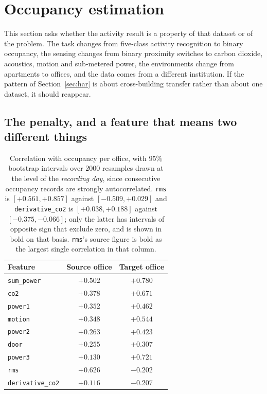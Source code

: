 \documentclass[a4paper,fleqn]{cas-dc}
\begin{document}
\section{Occupancy estimation}
\label{sec:occ}

This section asks whether the activity result is a property of that dataset or of the
problem. The task changes from five-class activity recognition to binary occupancy, the
sensing changes from binary proximity switches to carbon dioxide, acoustics, motion and
sub-metered power, the environments change from apartments to offices, and the data comes
from a different institution. If the pattern of Section~\ref{sec:har} is about
cross-building transfer rather than about one dataset, it should reappear.

\subsection{The penalty, and a feature that means two different things}
\label{sec:occ-feat}

\begin{table}[t]
\centering
\caption{Correlation with occupancy per office, with $95\%$ bootstrap intervals over
$2000$ resamples drawn at the level of the \emph{recording day}, since consecutive
occupancy records are strongly autocorrelated. \texttt{rms} is $[+0.561,+0.857]$ against
$[-0.509,+0.029]$ and \texttt{derivative\_co2} is $[+0.038,+0.188]$ against
$[-0.375,-0.066]$; only the latter has intervals of opposite sign that exclude zero, and
is shown in bold on that basis. \texttt{rms}'s source figure is bold as the largest single
correlation in that column.}
\label{tab:occfeat}
\footnotesize
\setlength{\tabcolsep}{3pt}
\begin{tabular}{@{}lcc@{}}
\toprule
Feature & Source office & Target office \\
\midrule
\texttt{sum\_power} & $+0.502$ & $+0.780$ \\
\texttt{co2}        & $+0.378$ & $+0.671$ \\
\texttt{power1}     & $+0.352$ & $+0.462$ \\
\texttt{motion}     & $+0.348$ & $+0.544$ \\
\texttt{power2}     & $+0.263$ & $+0.423$ \\
\texttt{door}       & $+0.255$ & $+0.307$ \\
\texttt{power3}     & $+0.130$ & $+0.721$ \\
\midrule
\texttt{rms}             & $\mathbf{+0.626}$ & $-0.202$ \\
\texttt{derivative\_co2} & $\mathbf{+0.116}$ & $\mathbf{-0.207}$ \\
\bottomrule
\end{tabular}
\end{table}
\end{document}
